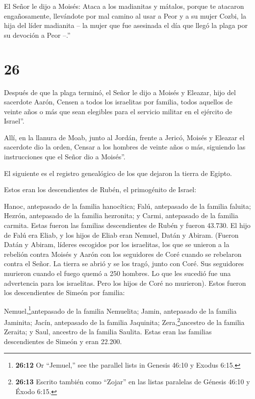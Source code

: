  El Señor le dijo a Moisés:  Ataca a los
madianitas y mátalos,  porque te atacaron engañosamente,
llevándote por mal camino al usar a Peor y a su mujer Cozbi, la hija del
líder madianita -- la mujer que fue asesinada el día que llegó la plaga
por su devoción a Peor --.''

\hypertarget{section-25}{%
\section{26}\label{section-25}}

 Después de que la plaga terminó, el Señor le dijo a Moisés
y Eleazar, hijo del sacerdote Aarón,  Censen a todos los
israelitas por familia, todos aquellos de veinte años o más que sean
elegibles para el servicio militar en el ejército de Israel''.

 Allí, en la llanura de Moab, junto al Jordán, frente a
Jericó, Moisés y Eleazar el sacerdote dio la orden,  Censar
a los hombres de veinte años o más, siguiendo las instrucciones que el
Señor dio a Moisés''.

El siguiente es el registro genealógico de los que dejaron la tierra de
Egipto.

 Estos eran los descendientes de Rubén, el primogénito de
Israel:

Hanoc, antepasado de la familia hanocítica; Falú, antepasado de la
familia faluita;  Hezrón, antepasado de la familia
hezronita; y Carmi, antepasado de la familia carmita.  Estas
fueron las familias descendientes de Rubén y fueron 43.730. 
El hijo de Falú era Eliab,  y los hijos de Eliab eran
Nemuel, Datán y Abiram. (Fueron Datán y Abiram, líderes escogidos por
los israelitas, los que se unieron a la rebelión contra Moisés y Aarón
con los seguidores de Coré cuando se rebelaron contra el Señor.
 La tierra se abrió y se los tragó, junto con Coré. Sus
seguidores murieron cuando el fuego quemó a 250 hombres. Lo que les
sucedió fue una advertencia para los israelitas.  Pero los
hijos de Coré no murieron).  Estos fueron los descendientes
de Simeón por familia:

Nemuel,\footnote{\textbf{26:12} Or ``Jemuel,'' see the parallel lists in
  Genesis 46:10 y Exodus 6:15.}antepasado de la familia Nemuelita;
Jamin, antepasado de la familia Jaminita; Jacín, antepasado de la
familia Jaquinita;  Zera,\footnote{\textbf{26:13} Escrito
  también como ``Zojar'' en las listas paralelas de Génesis 46:10 y
  Éxodo 6:15.}ancestro de la familia Zeraita; y Saul, ancestro de la
familia Saulita.  Estas eran las familias descendientes de
Simeón y eran 22.200.

